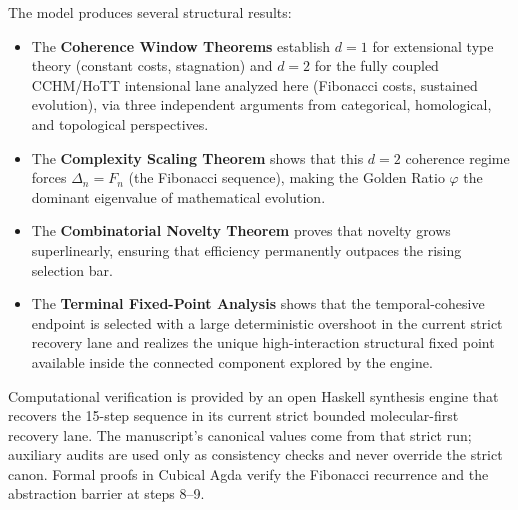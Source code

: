 \documentclass[11pt,a4paper]{article}
\theoremstyle{plain}
\theoremstyle{definition}
\theoremstyle{remark}
\begin{document}
The model produces several structural results:
\begin{itemize}[nosep]
    \item The \textbf{Coherence Window Theorems} establish $d = 1$ for extensional type theory (constant costs, stagnation) and $d = 2$ for the fully coupled CCHM/HoTT intensional lane analyzed here (Fibonacci costs, sustained evolution), via three independent arguments from categorical, homological, and topological perspectives.
    \item The \textbf{Complexity Scaling Theorem} shows that this $d = 2$ coherence regime forces $\Delta_n = F_n$ (the Fibonacci sequence), making the Golden Ratio $\varphi$ the dominant eigenvalue of mathematical evolution.
    \item The \textbf{Combinatorial Novelty Theorem} proves that novelty grows superlinearly, ensuring that efficiency permanently outpaces the rising selection bar.
    \item The \textbf{Terminal Fixed-Point Analysis} shows that the temporal-cohesive endpoint is selected with a large deterministic overshoot in the current strict recovery lane and realizes the unique high-interaction structural fixed point available inside the connected component explored by the engine.
\end{itemize}
Computational verification is provided by an open Haskell synthesis engine that recovers the 15-step sequence in its current strict bounded molecular-first recovery lane.
The manuscript's canonical values come from that strict run; auxiliary audits are used only as consistency checks and never override the strict canon.
Formal proofs in Cubical Agda verify the Fibonacci recurrence and the abstraction barrier at steps 8--9.
\end{document}
